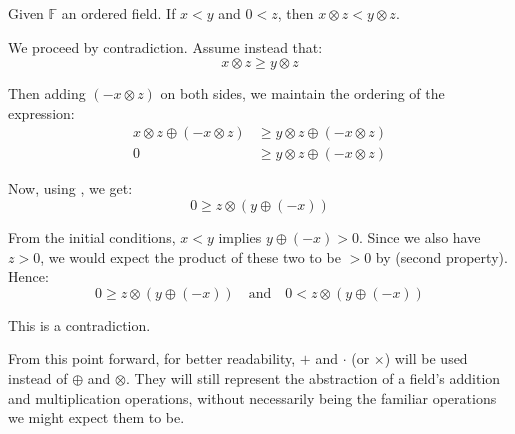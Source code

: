 \begin{theorem}
Given $\mathbb{F}$ an ordered field. If $x < y$ and $0 < z$, then $x \otimes z < y \otimes z$.
\end{theorem}

\begin{bookproof}
We proceed by contradiction. Assume instead that:
\[
x \otimes z \geq y \otimes z
\]

Then adding $(-x \otimes z)$ on both sides, we maintain the ordering of the expression:
\begin{align*}
x \otimes z \oplus (-x \otimes z) &\geq y \otimes z \oplus (-x \otimes z) \\
0 &\geq y \otimes z \oplus (-x \otimes z)
\end{align*}

Now, using , we get:
\[
0 \geq z \otimes (y \oplus (-x))
\]

From the initial conditions, $x < y$ implies $y \oplus (-x) > 0$. Since we also have $z > 0$, we would expect the product of these two to be $> 0$ by  (second property). Hence:
\[
0 \geq z \otimes (y \oplus (-x)) \quad \text{and} \quad 0 < z \otimes (y \oplus (-x))
\]

This is a contradiction.
\end{bookproof}

From this point forward, for better readability, $+$ and $\cdot$ (or $\times$) will be used instead of $\oplus$ and $\otimes$. They will still represent the abstraction of a field's addition and multiplication operations, without necessarily being the familiar operations we might expect them to be.

\newpage
